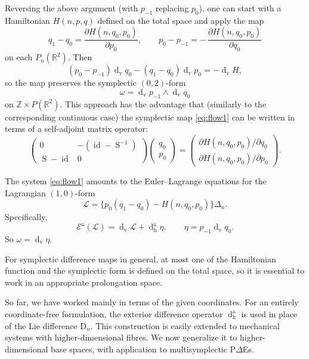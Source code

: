 \documentclass[11pt]{article} %
\numberwithin{equation}{section}
\newcommand{\es}{\operatorname{S}}
\newcommand{\id}{\operatorname{id}}
\newcommand{\upd}{\operatorname{d}}
\newcommand{\uph}{\operatorname{h}}
\newcommand{\upv}{\operatorname{v}}
\newcommand{\dv}{\upd_{\upv}\!}
\newcommand{\diffn}{\mathrm{D}_{n}}
\newcommand{\mcE}{\mathcal{E}}
\newcommand{\msL}{\mathscr{L}}
\newcommand{\dDh}{\upd^{\vartriangle}_{\uph}}
\theoremstyle{plain}
\theoremstyle{definition}
\begin{document}
Reversing the above argument (with $p_{-1}$ replacing $p_0$), one can start with a Hamiltonian $H(n,p,q)$ defined on the total space and apply the map
\begin{equation}
\label{eq:flow1}
q_1-q_0=\frac{\partial H(n,q_0,p_0)}{\partial p_0},\qquad
p_0-p_{-1}=-\,\frac{\partial H(n,q_0,p_0)}{\partial q_0}
\end{equation}
on each $P_n(\mathbb{R}^2)$. Then
\[
(p_0-p_{-1}) \dv q_0-(q_1-q_{0}) \dv p_0 =-\dv H,
\]
so the map preserves the symplectic $(0,2)$-form
\begin{equation}\label{om1std}
\omega =\dv p_{-1}\wedge \dv q_0
\end{equation}
on $\mathbb{Z}\times P(\mathbb{R}^2)$. This approach has the advantage that
(similarly to the corresponding continuous case) the symplectic map \eqref{eq:flow1} can be written in terms of a self-adjoint matrix operator:
\begin{equation}
    \left(
\begin{array}{cc}
  0&-(\id-\es^{-1})\\
  \es-\id&0
\end{array}
    \right)
      \left(
\begin{array}{c}
  q_0\\
  p_0
\end{array}
    \right)=
         \left(
    \begin{array}{c}
    \partial H(n,q_0,p_0)/\partial q_0\\
    \partial H(n,q_0,p_0)/\partial p_0
    \end{array}
    \right).
\end{equation}

The system \eqref{eq:flow1} amounts to the Euler--Lagrange equations for the Lagrangian $(1,0)$-form
\[
\msL=\{p_0(q_1-q_0)-H(n,q_0,p_0)\}\Delta_n.
\]
Specifically,
\[
\mcE^{\vartriangle}(\msL)=\dv \msL+\upd_{\uph}^{\vartriangle}\!\eta,\qquad \eta=p_{-1}\dv q_0.
\]
So $\omega=\dv \eta$.

For symplectic difference maps in general, at most one of the Hamiltonian function and the symplectic form is defined on the total space, so it is essential to work in an appropriate prolongation space.

So far, we have worked mainly in terms of the given coordinates. For an entirely coordinate-free formulation, the exterior difference operator $\dDh$ is used in place of the Lie difference $\diffn$. This construction is easily extended to mechanical systems with higher-dimensional fibres. We now generalize it to higher-dimensional base spaces, with application to multisymplectic P$\Delta$Es.
\end{document}
